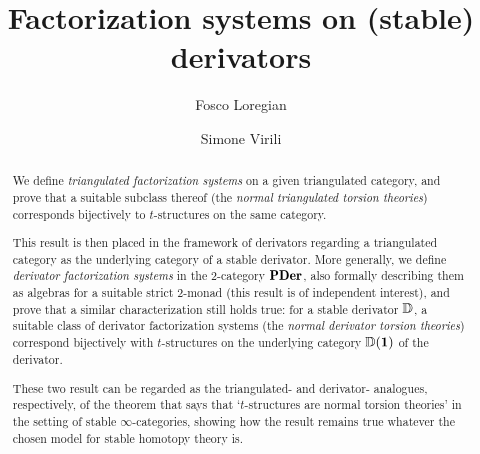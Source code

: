 \documentclass[a4paper,10pt]{amsart}
\title{Factorization systems on (stable) derivators}
\author{Fosco Loregian}
\author[Simone Virili]{Simone Virili}
\begin{document}
\maketitle
\begin{abstract}
We define \emph{triangulated factorization systems} on a given triangulated category, and prove that a suitable subclass thereof (the \emph{normal triangulated torsion theories}) corresponds bijectively to $t$-structures on the same category.

This result is then placed in the framework of derivators regarding a triangulated category as the underlying category of a stable derivator. More generally, we define \emph{derivator factorization systems} in the 2-category $\PDer$, also formally describing them as algebras for a suitable strict 2-monad (this result is of independent interest), and prove that a similar characterization still holds true: for a stable derivator $\mathbb{D}$, a suitable class of derivator factorization systems (the \emph{normal derivator torsion theories}) correspond bijectively with $t$-structures on the underlying category $\D(\uno)$ of the derivator.

These two result can be regarded as the triangulated- and derivator- analogues, respectively, of the theorem that says that `$t$-structures are normal torsion theories' in the setting of stable $\infty$-categories, showing how the result remains true whatever the chosen model for stable homotopy theory is.
\end{abstract}



\tableofcontents










\end{document}
